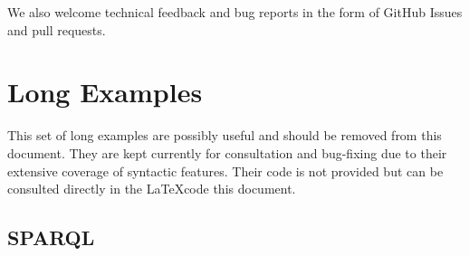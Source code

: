 \documentclass[11pt,a4paper,final,oneside,onecolumn]{article}
\begin{document}
	We also welcome technical feedback and bug reports in the form of GitHub Issues
	and pull requests.
	
	\section{Long Examples}
	This set of long examples are possibly useful and should be removed from this document. They are kept currently for consultation and bug-fixing due to their extensive coverage of syntactic features. Their code is not provided but can be consulted directly in the \LaTeX code this document. 
	
	\subsection{SPARQL}
	
\end{document}
